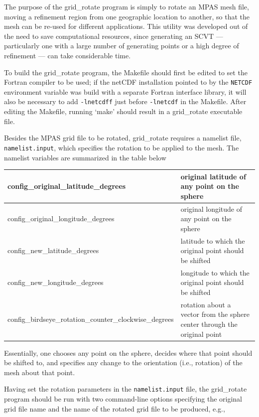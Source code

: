 The purpose of the grid\_rotate program is simply to rotate an MPAS mesh file,
moving a refinement region from one geographic location to another, so that the
mesh can be re-used for different applications. This utility was developed out
of the need to save computational resources, since generating an SCVT ---
particularly one with a large number of generating points or a high degree of
refinement --- can take considerable time.

To build the grid\_rotate program, the Makefile should first be edited to set
the Fortran compiler to be used; if the netCDF installation pointed to by the
{\tt NETCDF} environment variable was build with a separate Fortran interface
library, it will also be necessary to add {\tt -lnetcdff} just before {\tt -lnetcdf} in 
the Makefile. After editing the Makefile, running `make' should
result in a grid\_rotate executable file.

Besides the MPAS grid file to be rotated, grid\_rotate requires a namelist file,
{\tt namelist.input}, which specifies the rotation to be applied to the mesh.
The namelist variables are summarized in the table below
   
\vspace{12pt}
\begin{longtable}{|p{3.25in} |p{2.5in}|}
\hline
config\_original\_latitude\_degrees & original latitude of any point on the sphere \\ \hline
config\_original\_longitude\_degrees & original longitude of any point on the sphere \\ \hline
config\_new\_latitude\_degrees &  latitude to which the original point should be shifted \\ \hline
config\_new\_longitude\_degrees &  longitude to which the original point should be shifted \\ \hline
config\_birdseye\_rotation\_counter\_clockwise\_degrees & rotation about a vector from the sphere center through the original point \\ \hline
\end{longtable}
\vspace{12pt}

\noindent Essentially, one chooses any point on the sphere, decides where that
point should be shifted to, and specifies any change to the orientation (i.e.,
rotation) of the mesh about that point. 

Having set the rotation parameters in the {\tt namelist.input} file, the
grid\_rotate program should be run with two command-line options specifying the
original grid file name and the name of the rotated grid file to be produced,
e.g.,

